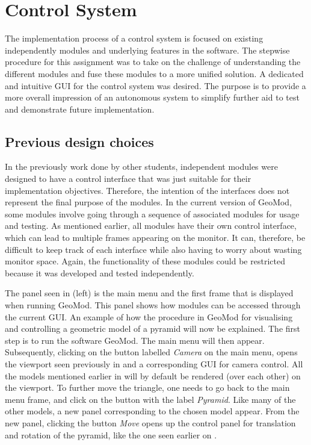 \chapter{Control System}

The implementation process of a control system is focused on existing independently modules and underlying features in the software. The stepwise procedure for this assignment was to take on the challenge of understanding the different modules and fuse these modules to a more unified solution. A dedicated and intuitive GUI for the control system was desired. The purpose is to provide a more overall impression of an autonomous system to simplify further aid to test and demonstrate future implementation.

\section{Previous design choices}

In the previously work done by other students, independent modules were designed to have a control interface that was just suitable for their implementation objectives. Therefore, the intention of the interfaces does not represent the final purpose of the modules. In the current version of GeoMod, some modules involve going through a sequence of associated modules for usage and testing. As mentioned earlier, all modules have their own control interface,  which can lead to multiple frames appearing on the monitor. It can, therefore, be difficult to keep track of each interface while also having to worry about wasting monitor space. Again, the functionality of these modules could be restricted because it was developed and tested independently.

\label{chap:example}
The panel seen in  (left) is the main menu and the first frame that is displayed when running GeoMod. This panel shows how modules can be accessed through the current GUI. An example of how the procedure in GeoMod for visualising and controlling a geometric model of a pyramid will now be explained. The first step is to run the software GeoMod. The main menu will then appear. Subsequently, clicking on the button labelled \textit{Camera} on the main menu, opens the viewport seen previously in  and a corresponding GUI for camera control. All the models mentioned earlier in  will by default be rendered (over each other) on the viewport. To further move the triangle, one needs to go back to the main menu frame, and click on the button with the label \textit{Pyramid}. Like many of the other models, a new panel corresponding to the chosen model appear. From the new panel, clicking the button \textit{Move} opens up the control panel for translation and rotation of the pyramid, like the one seen earlier on .

